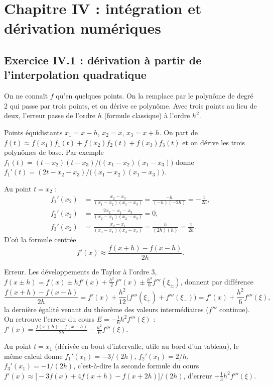 \chapter{Chapitre IV : intégration et dérivation numériques}

\section{Exercice IV.1 : dérivation à partir de l'interpolation quadratique}


\Pourquoi On ne connaît $f$ qu'en quelques points. On la remplace par le
polynôme de degré 2 qui passe par trois points, et on dérive ce polynôme. Avec
trois points au lieu de deux, l'erreur passe de l'ordre $h$ (formule classique)
à l'ordre $h^2$.

\Etapes
{} Points équidistants $x_1 = x - h$, $x_2 = x$, $x_3 = x + h$. On part de
$f(t) \approx f(x_1)f_1(t) + f(x_2)f_2(t) + f(x_3)f_3(t)$ et on dérive les
trois polynômes de base. Par exemple
$f_1(t) = (t - x_2)(t - x_3)/\bigl((x_1 - x_2)(x_1 - x_3)\bigr)$ donne
$f_1'(t) = (2t - x_2 - x_3)/\bigl((x_1 - x_2)(x_1 - x_3)\bigr)$.

 Au point $t = x_2$ :
\[
\begin{aligned}
  f_1'(x_2) &= \frac{x_2 - x_3}{(x_1 - x_2)(x_1 - x_3)} = \frac{-h}{(-h)(-2h)} = -\frac{1}{2h},\\
  f_2'(x_2) &= \frac{2x_2 - x_1 - x_3}{(x_2 - x_1)(x_2 - x_3)} = 0,\\
  f_3'(x_2) &= \frac{x_2 - x_1}{(x_3 - x_1)(x_3 - x_2)} = \frac{h}{(2h)(h)} = \frac{1}{2h}.
\end{aligned}
\]
D'où la formule centrée
\[
  f'(x) \approx \frac{f(x+h) - f(x-h)}{2h} .
\]

 Erreur. Les développements de Taylor à l'ordre 3,
$f(x \pm h) = f(x) \pm hf'(x) + \tfrac{h^2}{2}f''(x) \pm \tfrac{h^3}{6}f'''(\xi_\pm)$,
donnent par différence
\[
  \frac{f(x+h) - f(x-h)}{2h} = f'(x) + \frac{h^2}{12}\bigl(f'''(\xi_+) + f'''(\xi_-)\bigr)
  = f'(x) + \frac{h^2}{6}f'''(\xi),
\]
la dernière égalité venant du théorème des valeurs intermédiaires ($f'''$
continue). On retrouve l'erreur du cours $E = -\tfrac{1}{6}h^2f'''(\xi)$ :
$f'(x) = \frac{f(x+h) - f(x-h)}{2h} - \frac{h^2}{6}f'''(\xi)$.

 Au point $t = x_1$ (dérivée en bout d'intervalle, utile au bord d'un
tableau), le même calcul donne $f_1'(x_1) = -3/(2h)$, $f_2'(x_1) = 2/h$,
$f_3'(x_1) = -1/(2h)$, c'est-à-dire la seconde formule du cours
$f'(x) \approx \bigl[-3f(x) + 4f(x+h) - f(x+2h)\bigr]/(2h)$, d'erreur
$+\tfrac13h^2f'''(\xi)$.

